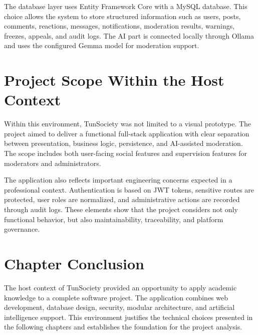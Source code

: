 The database layer uses Entity Framework Core with a MySQL database. This choice allows the system to store structured information such as users, posts, comments, reactions, messages, notifications, moderation results, warnings, freezes, appeals, and audit logs. The AI part is connected locally through Ollama and uses the configured Gemma model for moderation support.

\section{Project Scope Within the Host Context}

Within this environment, TunSociety was not limited to a visual prototype. The project aimed to deliver a functional full-stack application with clear separation between presentation, business logic, persistence, and AI-assisted moderation. The scope includes both user-facing social features and supervision features for moderators and administrators.

The application also reflects important engineering concerns expected in a professional context. Authentication is based on JWT tokens, sensitive routes are protected, user roles are normalized, and administrative actions are recorded through audit logs. These elements show that the project considers not only functional behavior, but also maintainability, traceability, and platform governance.

\section{Chapter Conclusion}

The host context of TunSociety provided an opportunity to apply academic knowledge to a complete software project. The application combines web development, database design, security, modular architecture, and artificial intelligence support. This environment justifies the technical choices presented in the following chapters and establishes the foundation for the project analysis.
